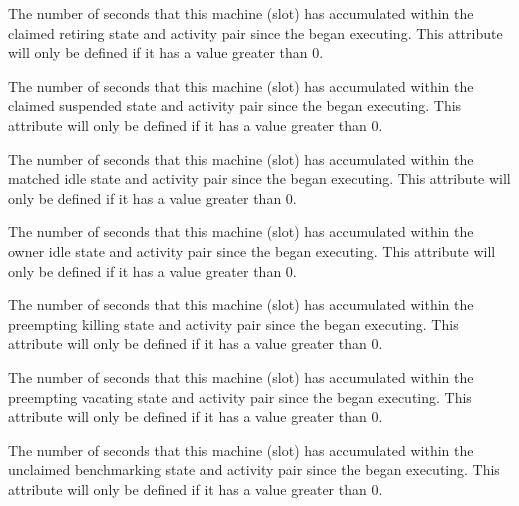 \begin{description}
%
\item[\AdAttr{TotalTimeClaimedRetiring}:] The number of seconds
that this machine (slot) has accumulated within the
claimed retiring state and activity pair since the 
began executing.
This attribute will only be defined if it has a value greater than 0.
%
\item[\AdAttr{TotalTimeClaimedSuspended}:] The number of seconds
that this machine (slot) has accumulated within the
claimed suspended state and activity pair since the 
began executing.
This attribute will only be defined if it has a value greater than 0.
%
\item[\AdAttr{TotalTimeMatchedIdle}:] The number of seconds
that this machine (slot) has accumulated within the
matched idle state and activity pair since the 
began executing.
This attribute will only be defined if it has a value greater than 0.
%
\item[\AdAttr{TotalTimeOwnerIdle}:] The number of seconds
that this machine (slot) has accumulated within the
owner idle state and activity pair since the 
began executing.
This attribute will only be defined if it has a value greater than 0.
%
\item[\AdAttr{TotalTimePreemptingKilling}:] The number of seconds
that this machine (slot) has accumulated within the
preempting killing state and activity pair since the 
began executing.
This attribute will only be defined if it has a value greater than 0.
%
\item[\AdAttr{TotalTimePreemptingVacating}:] The number of seconds
that this machine (slot) has accumulated within the
preempting vacating state and activity pair since the 
began executing.
This attribute will only be defined if it has a value greater than 0.
%
\item[\AdAttr{TotalTimeUnclaimedBenchmarking}:] The number of seconds
that this machine (slot) has accumulated within the
unclaimed benchmarking state and activity pair since the 
began executing.
This attribute will only be defined if it has a value greater than 0.

\end{description}
